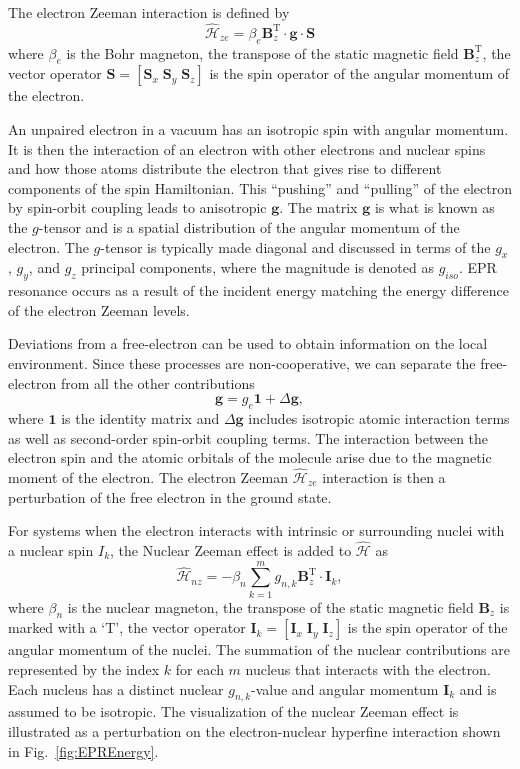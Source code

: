 The electron Zeeman interaction is defined by
\begin{equation*}
    \hat{\mathcal{H}}_{ze} = \beta_e \mathbf{B}^\text{T}_z  \cdot \mathbf{g} \cdot \mathbf{S}
\end{equation*}
where $\beta_e$ is the Bohr magneton, the transpose of the static magnetic field $\mathbf{B}_z^{\text{T}}$, the vector operator $\mathbf{S} = [\mathbf{S}_x \; \mathbf{S}_y \; \mathbf{S}_z]$ is the spin operator of the angular momentum of the electron. 

An unpaired electron in a vacuum has an isotropic spin with angular momentum. It is then the interaction of an electron with other electrons and nuclear spins and how those atoms distribute the electron that gives rise to different components of the spin Hamiltonian.\cite{abragam2012electron,harriman1978theoretical} This ``pushing'' and ``pulling'' of the electron by spin-orbit coupling leads to anisotropic $\mathbf{g}$. The matrix $\mathbf{g}$ is what is known as the $g$-tensor and is a spatial distribution of the angular momentum of the electron. The $g$-tensor is typically made diagonal and discussed in terms of the $g_x$, $g_y$, and $g_z$ principal components, where the magnitude is denoted as $g_{iso}$. EPR resonance occurs as a result of the incident energy matching the energy difference of the electron Zeeman levels. 

Deviations from a free-electron can be used to obtain information on the local environment. Since these processes are non-cooperative, we can separate the free-electron from all the other contributions
\begin{equation*}
    \mathbf{g} = g_e \mathbf{1} + \Delta \mathbf{g},
\end{equation*}
where $\mathbf{1}$ is the identity matrix and $\Delta \mathbf{g}$ includes isotropic atomic interaction terms as well as second-order spin-orbit coupling terms. The interaction between the electron spin and the atomic orbitals of the molecule arise due to the magnetic moment of the electron. \cite{griffith1964theory} The electron Zeeman $\hat{\mathcal{H}}_{ze}$ interaction is then a perturbation of the free electron in the ground state. 

For systems when the electron interacts with intrinsic or surrounding nuclei with a nuclear spin $I_k$, the Nuclear Zeeman effect is added to $\hat{\mathcal{H}}$ as
\begin{equation*}
    \hat{\mathcal{H}}_{nz} = - \beta_n \sum_{k=1}^m g_{n,k} \mathbf{B}^\text{T}_z  \cdot \mathbf{I}_k,
\end{equation*}
where $\beta_n$ is the nuclear magneton, the transpose of the static magnetic field $\mathbf{B}_z$ is marked with a `T', the vector operator $\mathbf{I}_k = [\mathbf{I}_x \; \mathbf{I}_y \; \mathbf{I}_z]$ is the spin operator of the angular momentum of the nuclei. The summation of the nuclear contributions are represented by the index $k$ for each $m$ nucleus that interacts with the electron. Each nucleus has a distinct nuclear $g_{n,k}$-value and angular momentum $\mathbf{I}_k$ and is assumed to be isotropic. The visualization of the nuclear Zeeman effect is illustrated as a perturbation on the electron-nuclear hyperfine interaction shown in Fig.~\ref{fig:EPREnergy}.

